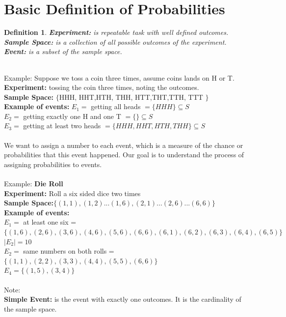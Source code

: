\documentclass[11pt,oneside]{book}
\theoremstyle{break}
\theoremstyle{break}
\newtheorem{defn}{Definition}[corL]
\newcommand{\note}{\color{Purple}Note: \color{black}}
\newcommand{\example}{\color{WildStrawberry}Example: \color{black}}
\begin{document}
	\section[Basic Definition of Probabilities]{Basic Definition of Probabilities}
	\begin{defn}
	\textbf{Experiment:} is repeatable task with well defined outcomes.\\
	\textbf{Sample Space:} is a collection of all possible outcomes of the experiment.\\
	\textbf{Event:} is a subset of the sample space.
	\end{defn}
	\hfill\\
	\example Suppose we toss a coin three times, assume coins lands on H or T.\\
	\textbf{Experiment: }tossing the coin three times, noting the outcomes.\\
	\textbf{Sample Space:} $\{$HHH, HHT,HTH, THH, HTT,THT,TTH, TTT $\}$\\
	\textbf{Example of events:} $E_1=$ getting all heads $=\{HHH\}\subseteq S$\\ 
	$E_2=$ getting exactly one H and one T $=\{\}\subseteq S$\\
	$E_3=$ getting at least two heads $=\{HHH, HHT, HTH, THH\}\subseteq S$\\
	\hfill\\
	We want to assign a number to each event, which is a measure of the chance or probabilities that this event happened. Our goal is to understand the process of assigning probabilities to events.\\
	\hfill\\
	\example \textbf{Die Roll}\\
	\textbf{Experiment:} Roll a six sided dice two times\\
	\textbf{Sample Space:}$\{(1,1),(1,2)...(1,6),(2,1)...(2,6)...(6,6)\}$\\
	\textbf{Example of events:} \\
	$E_1=$ at least one six = $\{(1,6),(2,6),(3,6),(4,6),(5,6),(6,6),(6,1),(6,2),(6,3),(6,4),(6,5)\}$\\
	$|E_2|=10$\\
	$E_2=$ same numbers on both rolls = $\{(1,1),(2,2),(3,3),(4,4),(5,5),(6,6)\}$\\
	$E_4=\{(1,5),(3,4)\}$\\
	\hfill\\
	\note\\ 
	\textbf{Simple Event:} is the event with exactly one outcomes. It is the cardinality of the sample space. \\
\end{document}
